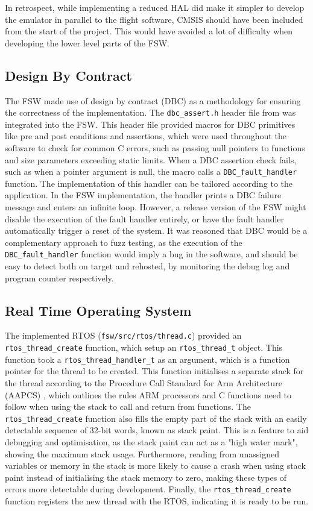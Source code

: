 \documentclass[../report.tex]{subfiles}
\begin{document}
In retrospect, while implementing a reduced HAL did make it simpler to develop
the emulator in parallel to the flight software, CMSIS should have been
included from the start of the project. This would have avoided a lot of
difficulty when developing the lower level parts of the FSW.

\subsection{Design By Contract}

The FSW made use of design by contract (DBC) as a methodology for ensuring the
correctness of the implementation. The \lstinline|dbc_assert.h| header file
from \citet{dbc_assert} was integrated into the FSW. This header file provided
macros for DBC primitives like pre and post conditions and assertions, which
were used throughout the software to check for common C errors, such as passing
null pointers to functions and size parameters exceeding static limits. When a
DBC assertion check fails, such as when a pointer argument is null, the macro
calls a \lstinline|DBC_fault_handler| function. The implementation of this
handler can be tailored according to the application. In the FSW
implementation, the handler prints a DBC failure message and enters an infinite
loop. However, a release version of the FSW might disable the execution of the
fault handler entirely, or have the fault handler automatically trigger a reset
of the system. It was reasoned that DBC would be a complementary approach to
fuzz testing, as the execution of the \lstinline|DBC_fault_handler| function
would imply a bug in the software, and should be easy to detect both on target
and rehosted, by monitoring the debug log and program counter respectively.

\subsection{Real Time Operating System} \label{sec:fsw-rtos}

The implemented RTOS (\lstinline|fsw/src/rtos/thread.c|) provided an
\lstinline|rtos_thread_create| function, which setup an
\lstinline|rtos_thread_t| object. This function took a
\lstinline|rtos_thread_handler_t| as an argument, which is a function pointer
for the thread to be created. This function initialises a separate stack for
the thread according to the Procedure Call Standard for Arm Architecture
(AAPCS) \citep{AAPCS}, which outlines the rules ARM processors and C functions
need to follow when using the stack to call and return from functions. The
\lstinline|rtos_thread_create| function also fills the empty part of the stack
with an easily detectable sequence of 32-bit words, known as stack paint. This
is a feature to aid debugging and optimisation, as the stack paint can act as a
"high water mark", showing the maximum stack usage. Furthermore, reading from
unassigned variables or memory in the stack is more likely to cause a crash
when using stack paint instead of initialising the stack memory to zero, making these
types of errors more detectable during development. Finally, the
\lstinline|rtos_thread_create| function registers the new thread with the RTOS,
indicating it is ready to be run.
\end{document}
